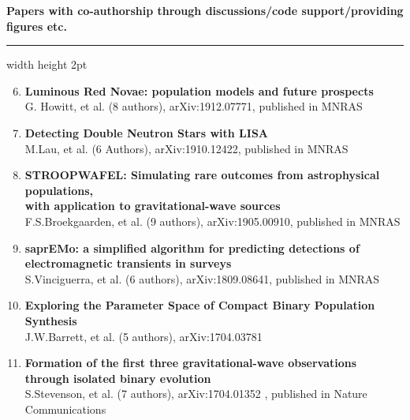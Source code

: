 \documentclass[]{res} %
\begin{document}
{\large \textbf{Papers with co-authorship through discussions/code support/providing figures etc.}} 
{\color{lightgray}\hrule width \textwidth height 2pt}
\begin{enumerate}
\setcounter{enumi}{5}
\item \textbf{Luminous Red Novae: population models and future prospects}\\
G. Howitt, et al. (8 authors), arXiv:1912.07771, published in MNRAS

\item \textbf{Detecting Double Neutron Stars with LISA}\\
M.Lau, et al. (6 Authors), arXiv:1910.12422, published in MNRAS

\item \textbf{STROOPWAFEL: Simulating rare outcomes from astrophysical populations,\\ with application to gravitational-wave sources}\\
F.S.Broekgaarden, et al. (9 authors), arXiv:1905.00910, published in MNRAS

\item \textbf{saprEMo: a simplified algorithm for predicting detections of \\ electromagnetic transients in surveys}\\
S.Vinciguerra, et al. (6 authors), arXiv:1809.08641, published in MNRAS

\item \textbf{Exploring the Parameter Space of Compact Binary Population Synthesis}\\
J.W.Barrett, et al. (5 authors), arXiv:1704.03781

\item \textbf{Formation of the first three gravitational-wave observations through isolated binary evolution}\\
S.Stevenson, et al. (7 authors), arXiv:1704.01352 , published in Nature Communications
\end{enumerate}
\end{document}
